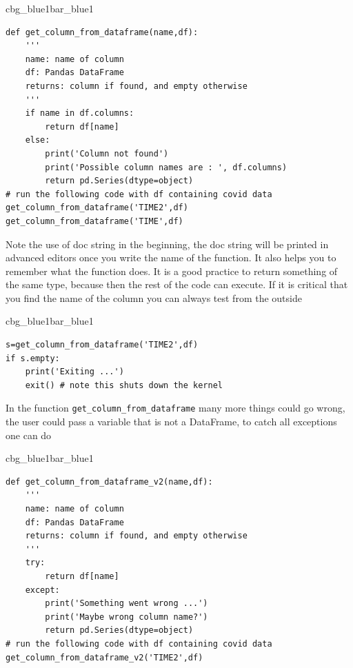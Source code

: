 \documentclass[%
oneside,                 %
final,                   %
10pt]{article}
\newenvironment{_pro_tight}[2]{
   \def\FrameCommand{\color{#2}\vrule width 1mm\normalcolor\colorbox{#1}}
   \FrameRule0.6pt\MakeFramed {\advance\hsize-2mm\FrameRestore}\vskip3mm}
   {\vskip0mm\endMakeFramed}
\newenvironment{pro}[2]{
\bgroup\rmfamily
\fboxsep=0mm\relax
\begin{_pro_tight}{#1}{#2}
\list{}{\parsep=-2mm\parskip=0mm\topsep=0pt\leftmargin=2mm
\rightmargin=2\leftmargin\leftmargin=4pt\relax}
\item\relax}
{\endlist\end{_pro_tight}\egroup}
\begin{document}
\begin{pro}{cbg_blue1}{bar_blue1}\begin{Verbatim}[numbers=none,fontsize=\fontsize{9pt}{9pt},baselinestretch=0.95,xleftmargin=2mm]
def get_column_from_dataframe(name,df):
    '''
    name: name of column
    df: Pandas DataFrame
    returns: column if found, and empty otherwise 
    '''
    if name in df.columns:
        return df[name]
    else:
        print('Column not found')
        print('Possible column names are : ', df.columns)
        return pd.Series(dtype=object)
# run the following code with df containing covid data
get_column_from_dataframe('TIME2',df)
get_column_from_dataframe('TIME',df)

\end{Verbatim}
\end{pro}
\noindent

Note the use of doc string in the beginning, the doc string will be printed in advanced editors once you write the name of the function. It also helps you to remember what the function does. It is a good practice to return something of the same type, because then the rest of the code can execute. If it is critical that you find the name of the column you can always test from the outside





\begin{pro}{cbg_blue1}{bar_blue1}\begin{Verbatim}[numbers=none,fontsize=\fontsize{9pt}{9pt},baselinestretch=0.95,xleftmargin=2mm]
s=get_column_from_dataframe('TIME2',df)
if s.empty:
    print('Exiting ...')
    exit() # note this shuts down the kernel

\end{Verbatim}
\end{pro}
\noindent

In the function \Verb!get_column_from_dataframe! many more things could go wrong, the user could pass a variable that is not a DataFrame, to catch all exceptions one can do















\begin{pro}{cbg_blue1}{bar_blue1}\begin{Verbatim}[numbers=none,fontsize=\fontsize{9pt}{9pt},baselinestretch=0.95,xleftmargin=2mm]
def get_column_from_dataframe_v2(name,df):
    '''
    name: name of column
    df: Pandas DataFrame
    returns: column if found, and empty otherwise 
    '''
    try:
        return df[name]
    except:
        print('Something went wrong ...')
        print('Maybe wrong column name?')
        return pd.Series(dtype=object)
# run the following code with df containing covid data
get_column_from_dataframe_v2('TIME2',df)

\end{Verbatim}
\end{pro}
\noindent
\end{document}
